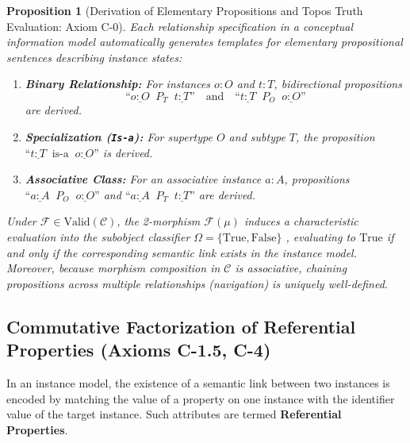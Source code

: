 \documentclass[11pt,a4paper]{article}
\theoremstyle{definition}
\theoremstyle{plain}
\newtheorem{proposition}{Proposition}[section]
\theoremstyle{remark}
\newcommand{\Valid}{\mathrm{Valid}}
\begin{document}
\begin{proposition}[Derivation of Elementary Propositions and Topos Truth Evaluation: Axiom C-0]\label{prop:propositions}
Each relationship specification in a conceptual information model automatically generates templates for elementary propositional sentences describing instance states:
\begin{enumerate}
    \item \textbf{Binary Relationship:} For instances $o:O$ and $t:T$, bidirectional propositions
    \begin{equation}
    \text{``}\underline{o:O}\;\; P_T \;\;\underline{t:T}\text{''} \quad \text{and} \quad \text{``}\underline{t:T}\;\; P_O \;\;\underline{o:O}\text{''}
    \end{equation}
    are derived.
    \item \textbf{Specialization (\texttt{Is-a}):} For supertype $O$ and subtype $T$, the proposition $\text{``}\underline{t:T}\;\; \text{is-a} \;\;\underline{o:O}\text{''}$ is derived.
    \item \textbf{Associative Class:} For an associative instance $a:A$, propositions $\text{``}\underline{a:A}\;\; P_O \;\;\underline{o:O}\text{''}$ and $\text{``}\underline{a:A}\;\; P_T \;\;\underline{t:T}\text{''}$ are derived.
\end{enumerate}
Under $\mathcal{F} \in \Valid(\mathcal{C})$, the 2-morphism $\mathcal{F}(\mu)$ induces a characteristic evaluation into the subobject classifier $\Omega = \{\mathrm{True}, \mathrm{False}\}$ \cite{maclane1992}, evaluating to $\mathrm{True}$ if and only if the corresponding semantic link exists in the instance model. Moreover, because morphism composition in $\mathcal{C}$ is associative, chaining propositions across multiple relationships (navigation) is uniquely well-defined.
\end{proposition}

\subsection{Commutative Factorization of Referential Properties (Axioms C-1.5, C-4)}
In an instance model, the existence of a semantic link between two instances is encoded by matching the value of a property on one instance with the identifier value of the target instance. Such attributes are termed \textbf{Referential Properties}.
\end{document}
